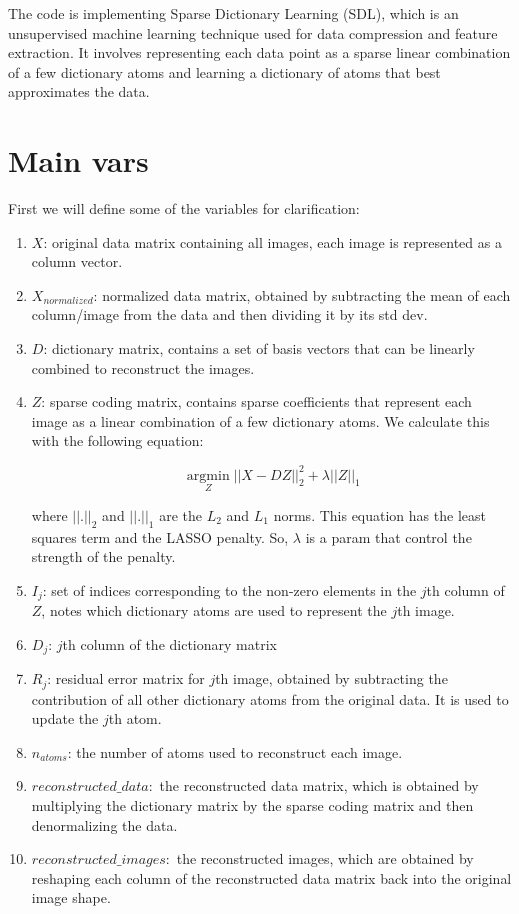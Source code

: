 \documentclass[11pt]{article}
\begin{document}
The code is implementing Sparse Dictionary Learning (SDL), which is an unsupervised machine learning technique used for data compression and feature extraction. It involves representing each data point as a sparse linear combination of a few dictionary atoms and learning a dictionary of atoms that best approximates the data.

\section{Main vars}

First we will define some of the variables for clarification:
\begin{enumerate}

    \item
    $X$: original data matrix containing all images, each image is represented as a column vector.
    \item
    $X_{normalized}$: normalized data matrix, obtained by subtracting the mean of each column/image from the data and then dividing it by its std dev.
    \item
    $D$: dictionary matrix, contains a set of basis vectors that can be linearly combined to reconstruct the images. 
    \item
    $Z$: sparse coding matrix, contains sparse coefficients that represent each image as a linear combination of a few dictionary atoms. We calculate this with the following equation:

    $$\underset{Z}{\operatorname{argmin}} ||X - DZ||^2_2 + \lambda ||Z||_1$$

    where $||.||_2$ and $||.||_1$ are the $L_2$ and $L_1$ norms. This equation has the least squares term and the LASSO penalty. So, $\lambda$ is a param that control the strength of the penalty. 
    \item
    $I_j$: set of indices corresponding to the non-zero elements in the $j$th column of $Z$, notes which dictionary atoms are used to represent the $j$th image.
    \item
    $D_j$: $j$th column of the dictionary matrix
    \item
    $R_j$: residual error matrix for $j$th image, obtained by subtracting the contribution of all other dictionary atoms from the original data. It is used to update the $j$th atom.
    \item
    $n_{atoms}$: the number of atoms used to reconstruct each image.
    \item
    $reconstructed\_data:$ the reconstructed data matrix, which is obtained by multiplying the dictionary matrix by the sparse coding matrix and then denormalizing the data.
    \item
    $reconstructed\_images:$ the reconstructed images, which are obtained by reshaping each column of the reconstructed data matrix back into the original image shape.
\end{enumerate}
\end{document}
